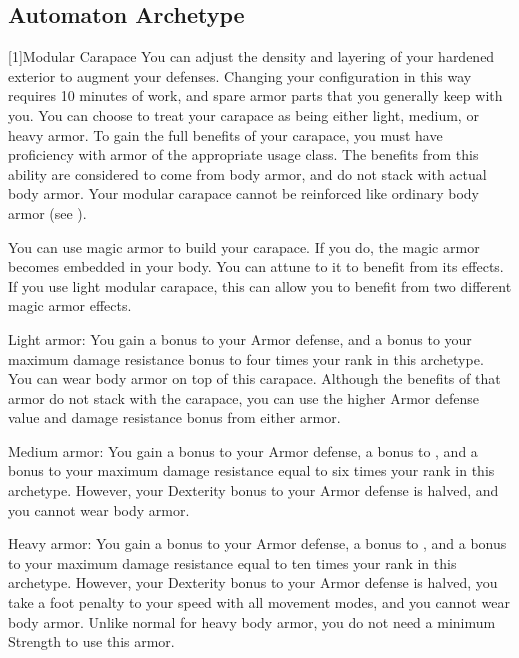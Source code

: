   \subsection{Automaton Archetype}

    [1]{Modular Carapace} You can adjust the density and layering of your hardened exterior to augment your defenses.
      Changing your configuration in this way requires 10 minutes of work, and spare armor parts that you generally keep with you.
      You can choose to treat your carapace as being either light, medium, or heavy armor.
      To gain the full benefits of your carapace, you must have proficiency with armor of the appropriate usage class.
      The benefits from this ability are considered to come from body armor, and do not stack with actual body armor.
      Your modular carapace cannot be reinforced like ordinary body armor (see ).

      You can use magic armor to build your carapace.
      If you do, the magic armor becomes embedded in your body.
      You can attune to it to benefit from its effects.
      If you use light modular carapace, this can allow you to benefit from two different magic armor effects.



      \begin{raggeditemize}
        \item Light armor: You gain a  bonus to your Armor defense, and a bonus to your maximum damage resistance bonus to four times your rank in this archetype.
          You can wear body armor on top of this carapace.
          Although the benefits of that armor do not stack with the carapace, you can use the higher Armor defense value and damage resistance bonus from either armor.
        \item Medium armor: You gain a  bonus to your Armor defense, a  bonus to , and a bonus to your maximum damage resistance equal to six times your rank in this archetype.
          However, your Dexterity bonus to your Armor defense is halved, and you cannot wear body armor.
        \item Heavy armor: You gain a  bonus to your Armor defense, a  bonus to , and a bonus to your maximum damage resistance equal to ten times your rank in this archetype.
          However, your Dexterity bonus to your Armor defense is halved, you take a  foot penalty to your speed with all movement modes, and you cannot wear body armor.
          Unlike normal for heavy body armor, you do not need a minimum Strength to use this armor.
      \end{raggeditemize}

